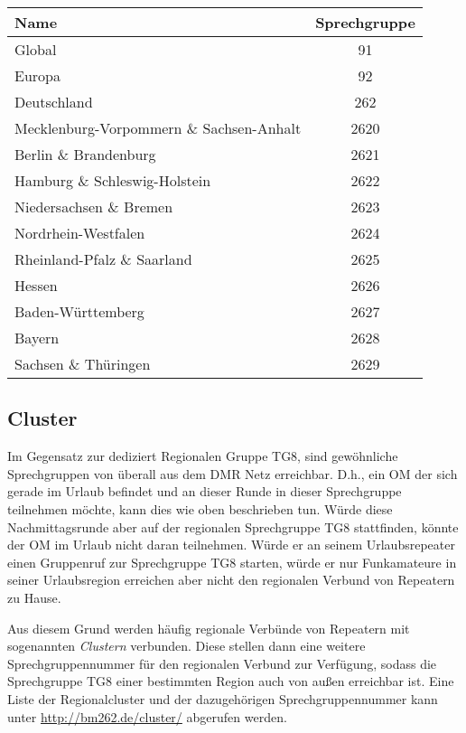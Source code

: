 \begin{table}[!h]
 \centering
 \begin{tabular}{|l|c|} \hline
  Name & Sprechgruppe \\ \hline
  Global & 91 \\
  Europa & 92 \\
  Deutschland & 262 \\
  Mecklenburg-Vorpommern \& Sachsen-Anhalt & 2620 \\
  Berlin \& Brandenburg & 2621 \\
  Hamburg \& Schleswig-Holstein & 2622 \\
  Niedersachsen \& Bremen & 2623 \\
  Nordrhein-Westfalen & 2624 \\
  Rheinland-Pfalz \& Saarland & 2625 \\
  Hessen & 2626 \\
  Baden-Württemberg & 2627 \\
  Bayern & 2628 \\
  Sachsen \& Thüringen & 2629 \\ \hline
 \end{tabular}
 \caption{} \label{tab:talkgroups}
\end{table}

\subsection{Cluster}
Im Gegensatz zur dediziert Regionalen Gruppe TG8, sind gewöhnliche Sprechgruppen von überall aus dem DMR Netz erreichbar. D.h., ein OM der sich gerade im Urlaub befindet und an dieser Runde in dieser Sprechgruppe teilnehmen möchte, kann dies wie oben beschrieben tun. Würde diese Nachmittagsrunde aber auf der regionalen Sprechgruppe TG8 stattfinden, könnte der OM im Urlaub nicht daran teilnehmen. Würde er an seinem Urlaubsrepeater einen Gruppenruf zur Sprechgruppe TG8 starten, würde er nur Funkamateure in seiner Urlaubsregion erreichen aber nicht den regionalen Verbund von Repeatern zu Hause.

Aus diesem Grund werden häufig regionale Verbünde von Repeatern mit sogenannten \emph{Clustern} verbunden. Diese  stellen dann eine weitere Sprechgruppennummer für den regionalen Verbund zur Verfügung, sodass die Sprechgruppe TG8 einer bestimmten Region auch von außen erreichbar ist. Eine Liste der Regionalcluster und der dazugehörigen Sprechgruppennummer kann unter \url{http://bm262.de/cluster/} abgerufen werden.
